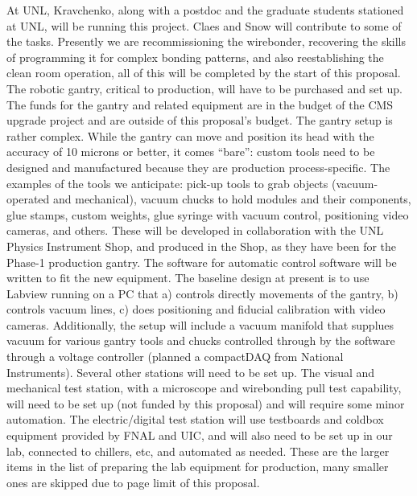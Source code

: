 At UNL, Kravchenko, along with a postdoc and the graduate students stationed at UNL, will be running this project. Claes and Snow will contribute to some of the tasks. Presently we are recommissioning the wirebonder, recovering the skills of programming it for complex bonding patterns, and also reestablishing the clean room operation, all of this will be completed by the start of this proposal. The robotic gantry, critical to production, will have to be purchased and set up. The funds for the gantry and related equipment are in the budget of the CMS upgrade project and are outside of this proposal's budget. The gantry setup is rather complex. While the gantry can move and position its head with the accuracy of 10 microns or better, it comes ``bare'': custom tools need to be designed and manufactured because they are production process-specific. The examples of the tools we anticipate: pick-up tools to grab objects (vacuum-operated and mechanical), vacuum chucks to hold modules and their components, glue stamps, custom weights, glue syringe with vacuum control, positioning video cameras, and others. These will be developed in collaboration with the UNL Physics Instrument Shop, and produced in the Shop, as they have been for the Phase-1 production gantry. The software for automatic control software will be written to fit the new equipment. The baseline design at present is to use Labview running on a PC that a) controls directly movements of the gantry, b) controls vacuum lines, c) does positioning and fiducial calibration with video cameras. Additionally, the setup will include a vacuum manifold that supplues vacuum for various gantry tools and chucks controlled through by the software through a voltage controller (planned a compactDAQ from National Instruments). Several other stations will need to be set up. The visual and mechanical test station, with a microscope and wirebonding pull test capability, will need to be set up (not funded by this proposal) and will require some minor automation. The electric/digital test station will use testboards and coldbox equipment provided by FNAL and UIC, and will also need
to be set up in our lab, connected to chillers, etc, and automated as needed. These are the larger items in the list of preparing the lab equipment for production, many smaller ones are skipped due to page limit of this proposal.


